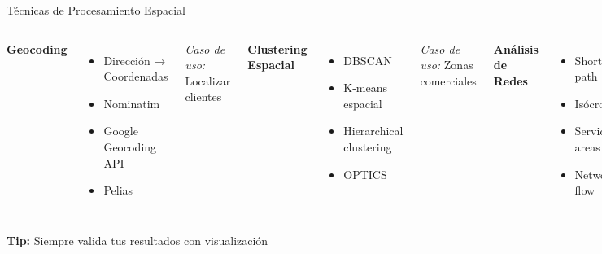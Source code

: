 \documentclass[10pt,aspectratio=169]{beamer}
\begin{document}
\begin{frame}{Técnicas de Procesamiento Espacial}
    \begin{columns}[T]
        \textbf{Geocoding}
        \begin{itemize}
            \item Dirección → Coordenadas
            \item Nominatim
            \item Google Geocoding API
            \item Pelias
        \end{itemize}
        
        \vspace{0.3cm}
        \textit{Caso de uso:} Localizar clientes
        
        \textbf{Clustering Espacial}
        \begin{itemize}
            \item DBSCAN
            \item K-means espacial
            \item Hierarchical clustering
            \item OPTICS
        \end{itemize}
        
        \vspace{0.3cm}
        \textit{Caso de uso:} Zonas comerciales
        
        \textbf{Análisis de Redes}
        \begin{itemize}
            \item Shortest path
            \item Isócronas
            \item Service areas
            \item Network flow
        \end{itemize}
        
        \vspace{0.3cm}
        \textit{Caso de uso:} Rutas óptimas
    \end{columns}
    
    \vspace{0.5cm}
    \begin{tcolorbox}[colframe=green!70,colback=green!10]
        \centering\faLightbulb\space \textbf{Tip:} Siempre valida tus resultados con visualización
    \end{tcolorbox}
\end{frame}
\end{document}
